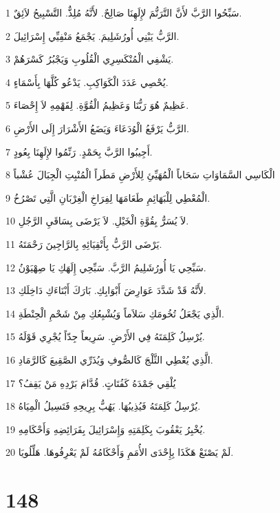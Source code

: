 \par 1 سَبِّحُوا الرَّبَّ لأَنَّ التَّرَنُّمَ لإِلَهِنَا صَالِحٌ. لأَنَّهُ مُلِذٌّ. التَّسْبِيحُ لاَئِقٌ.
\par 2 الرَّبُّ يَبْنِي أُورُشَلِيمَ. يَجْمَعُ مَنْفِيِّي إِسْرَائِيلَ.
\par 3 يَشْفِي الْمُنْكَسِرِي الْقُلُوبِ وَيَجْبُرُ كَسْرَهُمْ.
\par 4 يُحْصِي عَدَدَ الْكَوَاكِبِ. يَدْعُو كُلَّهَا بِأَسْمَاءٍ.
\par 5 عَظِيمٌ هُوَ رَبُّنَا وَعَظِيمُ الْقُوَّةِ. لِفَهْمِهِ لاَ إِحْصَاءَ.
\par 6 الرَّبُّ يَرْفَعُ الْوُدَعَاءَ وَيَضَعُ الأَشْرَارَ إِلَى الأَرْضِ.
\par 7 أَجِيبُوا الرَّبَّ بِحَمْدٍ. رَنِّمُوا لإِلَهِنَا بِعُودٍ.
\par 8 الْكَاسِي السَّمَاوَاتِ سَحَاباً الْمُهَيِّئِ لِلأَرْضِ مَطَراً الْمُنْبِتِ الْجِبَالَ عُشْباً
\par 9 الْمُعْطِي لِلْبَهَائِمِ طَعَامَهَا لِفِرَاخِ الْغِرْبَانِ الَّتِي تَصْرُخُ.
\par 10 لاَ يُسَرُّ بِقُوَّةِ الْخَيْلِ. لاَ يَرْضَى بِسَاقَيِ الرَّجُلِ.
\par 11 يَرْضَى الرَّبُّ بِأَتْقِيَائِهِ بِالرَّاجِينَ رَحْمَتَهُ.
\par 12 سَبِّحِي يَا أُورُشَلِيمُ الرَّبَّ. سَبِّحِي إِلَهَكِ يَا صِهْيَوْنُ.
\par 13 لأَنَّهُ قَدْ شَدَّدَ عَوَارِضَ أَبْوَابِكِ. بَارَكَ أَبْنَاءَكِ دَاخِلَكِ.
\par 14 الَّذِي يَجْعَلُ تُخُومَكِ سَلاَماً وَيُشْبِعُكِ مِنْ شَحْمِ الْحِنْطَةِ.
\par 15 يُرْسِلُ كَلِمَتَهُ فِي الأَرْضِ. سَرِيعاً جِدّاً يُجْرِي قَوْلَهُ.
\par 16 الَّذِي يُعْطِي الثَّلْجَ كَالصُّوفِ وَيُذَرِّي الصَّقِيعَ كَالرَّمَادِ.
\par 17 يُلْقِي جَمْدَهُ كَفُتَاتٍ. قُدَّامَ بَرْدِهِ مَنْ يَقِفُ؟
\par 18 يُرْسِلُ كَلِمَتَهُ فَيُذِيبُهَا. يَهُبُّ بِرِيحِهِ فَتَسِيلُ الْمِيَاهُ.
\par 19 يُخْبِرُ يَعْقُوبَ بِكَلِمَتِهِ وَإِسْرَائِيلَ بِفَرَائِضِهِ وَأَحْكَامِهِ.
\par 20 لَمْ يَصْنَعْ هَكَذَا بِإِحْدَى الأُمَمِ وَأَحْكَامُهُ لَمْ يَعْرِفُوهَا. هَلِّلُويَا.

\chapter{148}

